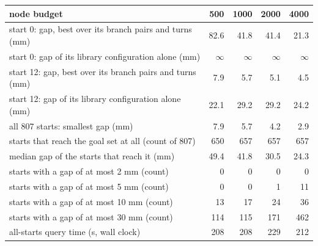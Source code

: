 \begin{tabular}{@{}>{\raggedright\arraybackslash}p{6.8cm} rrrr@{}}
\toprule
node budget & 500 & 1000 & 2000 & 4000 \\
\midrule
start 0: gap, best over its branch pairs and turns (mm) & 82.6 & 41.8 & 41.4 & 21.3 \\
start 0: gap of its library configuration alone (mm) & $\infty$ & $\infty$ & $\infty$ & $\infty$ \\
start 12: gap, best over its branch pairs and turns (mm) & 7.9 & 5.7 & 5.1 & 4.5 \\
start 12: gap of its library configuration alone (mm) & 22.1 & 29.2 & 29.2 & 24.2 \\
\midrule
all 807 starts: smallest gap (mm) & 7.9 & 5.7 & 4.2 & 2.9 \\
starts that reach the goal set at all (count of 807) & 650 & 657 & 657 & 657 \\
median gap of the starts that reach it (mm) & 49.4 & 41.8 & 30.5 & 24.3 \\
starts with a gap of at most 2 mm (count) & 0 & 0 & 0 & 0 \\
starts with a gap of at most 5 mm (count) & 0 & 0 & 1 & 11 \\
starts with a gap of at most 10 mm (count) & 13 & 17 & 24 & 36 \\
starts with a gap of at most 30 mm (count) & 114 & 115 & 171 & 462 \\
all-starts query time (s, wall clock) & 208 & 208 & 229 & 212 \\
\bottomrule
\end{tabular}

